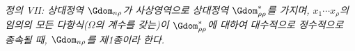 
\emph{정의 VII: 상대정역 $\Gdom_{n\rho}$가 사상영역으로 상대정역 $\Gdom^*_{\rho\rho}$를 가지며, $x_1\cdots x_\rho$의 임의의 모든 다항식($\Omega$의 계수를 갖는)이 $\Gdom^*_{\rho\rho}$에 대하여 대수적으로 정수적으로 종속될 때, $\Gdom_{n\rho}$를 제1종이라 한다.}
